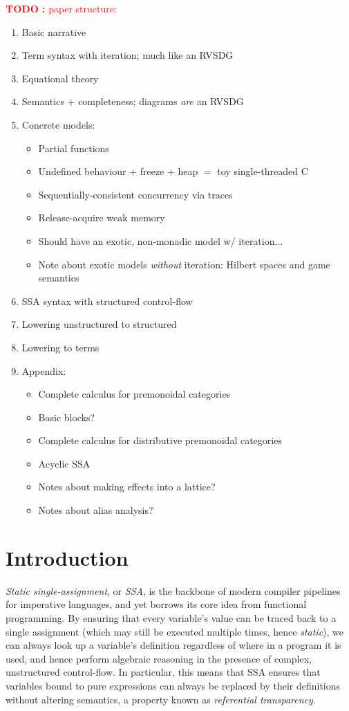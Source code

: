 \documentclass[acmsmall,screen,review]{acmart}
\newcounter{todos}
\newcommand{\TODO}[1]{{
  \stepcounter{todos}
  \begin{center}\large{\textcolor{red}{\textbf{TODO \arabic{todos}:} #1}}\end{center}
}}
\begin{document}
\TODO{paper structure:}
\begin{enumerate}
  \item Basic narrative
  \item Term syntax with iteration; much like an RVSDG \cite{rvsdg}
  \item Equational theory
  \item Semantics + completeness; diagrams \emph{are} an RVSDG
  \item Concrete models:
  \begin{itemize}
    \item Partial functions
    \item Undefined behaviour + freeze + heap $=$ toy single-threaded C
    \item Sequentially-consistent concurrency via traces
    \item Release-acquire weak memory
    \item Should have an exotic, non-monadic model w/ iteration...
    \item Note about exotic models \emph{without} iteration: Hilbert spaces and game semantics
  \end{itemize}
  \item SSA syntax with structured control-flow
  \item Lowering unstructured to structured
  \item Lowering to terms
  \item Appendix:
  \begin{itemize}
    \item Complete calculus for premonoidal categories
    \item Basic blocks?
    \item Complete calculus for distributive premonoidal categories
    \item Acyclic SSA
    \item Notes about making effects into a lattice?
    \item Notes about alias analysis?
  \end{itemize}
\end{enumerate}

\section{Introduction}

\emph{Static single-assignment}, or \emph{SSA}, is the backbone of modern compiler pipelines for
imperative languages, and yet borrows its core idea from functional programming. By ensuring that
every variable's value can be traced back to a single assignment (which may still be executed
multiple times, hence \emph{static}), we can always look up a variable's definition regardless of
where in a program it is used, and hence perform algebraic reasoning in the presence of complex,
unstructured control-flow. In particular, this means that SSA ensures that variables bound to pure
expressions can always be replaced by their definitions without altering semantics, a property known
as \emph{referential transparency}.
\end{document}
